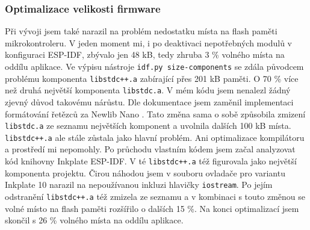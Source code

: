 \subsubsection{Optimalizace velikosti firmware} Při vývoji jsem také narazil na problém nedostatku místa na flash paměti mikrokontroleru. V jeden moment mi, i po deaktivaci nepotřebných modulů v konfiguraci ESP-IDF, zbývalo jen 48 kB, tedy zhruba 3 \% volného místa na oddílu aplikace. Ve výpisu nástroje \lstinline|idf.py size-components| se zdála původcem problému komponenta \lstinline|libstdc++.a| zabírající přes 201 kB paměti. O 70 \% více než druhá největší komponenta \lstinline|libstdc.a|. V mém kódu jsem nenalezl žádný zjevný důvod takovému nárůstu. Dle dokumentace jsem zaměnil implementaci formátování řetězců za Newlib Nano \cite{MinimizingBinarySize}. Tato změna sama o sobě způsobila zmizení \lstinline|libstdc.a| ze seznamu největších komponent a uvolnila dalších 100 kB místa. \lstinline|libstdc++.a| ale stále zůstala jako hlavní problém. Ani optimalizace kompilátoru a prostředí mi nepomohly. Po průchodu vlastním kódem jsem začal analyzovat kód knihovny Inkplate ESP-IDF. V té \lstinline|libstdc++.a| též figurovala jako největší komponenta projektu. Čirou náhodou jsem v souboru ovladače pro variantu Inkplate 10 narazil na nepoužívanou inkluzi hlavičky \lstinline|iostream|. Po jejím odstranění \lstinline|libstdc++.a| též zmizela ze seznamu a v kombinaci s touto změnou se volné místo na flash paměti rozšířilo o dalších 15 \%. Na konci optimalizací jsem skončil s 26 \% volného místa na oddílu aplikace.
